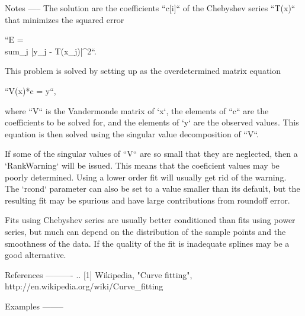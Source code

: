 \begin{DoxyVerb}
Notes
-----
The solution are the coefficients ``c[i]`` of the Chebyshev series
``T(x)`` that minimizes the squared error

``E = \\sum_j |y_j - T(x_j)|^2``.

This problem is solved by setting up as the overdetermined matrix
equation

``V(x)*c = y``,

where ``V`` is the Vandermonde matrix of `x`, the elements of ``c`` are
the coefficients to be solved for, and the elements of `y` are the
observed values.  This equation is then solved using the singular value
decomposition of ``V``.

If some of the singular values of ``V`` are so small that they are
neglected, then a `RankWarning` will be issued. This means that the
coeficient values may be poorly determined. Using a lower order fit
will usually get rid of the warning.  The `rcond` parameter can also be
set to a value smaller than its default, but the resulting fit may be
spurious and have large contributions from roundoff error.

Fits using Chebyshev series are usually better conditioned than fits
using power series, but much can depend on the distribution of the
sample points and the smoothness of the data. If the quality of the fit
is inadequate splines may be a good alternative.

References
----------
.. [1] Wikipedia, "Curve fitting",
       http://en.wikipedia.org/wiki/Curve_fitting

Examples
--------\end{DoxyVerb}
 \hypertarget{namespacepyneb_1_1utils_1_1chebyshev_abedf5cf14ea9229321fc5e4043c42a0d}{}
